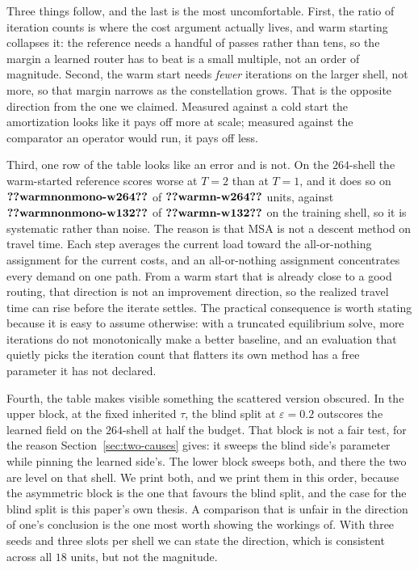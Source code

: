 \documentclass[journal]{IEEEtran}
\begin{document}


Three things follow, and the last is the most uncomfortable. First, the ratio of iteration
counts is where the cost argument actually lives, and warm starting collapses it: the reference
needs a handful of passes rather than tens, so the margin a learned router has to beat is a
small multiple, not an order of magnitude. Second, the warm start needs \emph{fewer} iterations
on the larger shell, not more, so that margin narrows as the constellation grows. That is the
opposite direction from the one we claimed. Measured against a cold start the amortization looks
like it pays off more at scale; measured against the comparator an operator would run, it pays
off less.

Third, one row of the table looks like an error and is not. On the $264$-shell the
warm-started reference scores worse at $T{=}2$ than at $T{=}1$, and it does so on
$\clm{warmnonmono-w264}$ of $\clm{warmn-w264}$ units, against
$\clm{warmnonmono-w132}$ of $\clm{warmn-w132}$ on the training shell, so it is
systematic rather than noise. The reason is that MSA is not a descent method on travel
time. Each step averages the current load toward the all-or-nothing assignment for the
current costs, and an all-or-nothing assignment concentrates every demand on one path.
From a warm start that is already close to a good routing, that direction is not an
improvement direction, so the realized travel time can rise before the iterate settles.
The practical consequence is worth stating because it is easy to assume otherwise: with a
truncated equilibrium solve, more iterations do not monotonically make a better baseline,
and an evaluation that quietly picks the iteration count that flatters its own method has
a free parameter it has not declared.

Fourth, the table makes visible something the scattered version obscured. In the upper block, at
the fixed inherited $\tau$, the blind split at $\varepsilon=0.2$ outscores the learned field on
the $264$-shell at half the budget. That block is not a fair test, for the reason
Section~\ref{sec:two-causes} gives: it sweeps the blind side's parameter while pinning the
learned side's. The lower block sweeps both, and there the two are level on that shell. We print
both, and we print them in this order, because the asymmetric block is the one that favours the
blind split, and the case for the blind split is this paper's own thesis. A comparison that is
unfair in the direction of one's conclusion is the one most worth showing the workings of. With three seeds and three slots per shell we can state the direction, which
is consistent across all $18$ units, but not the magnitude.
\end{document}
